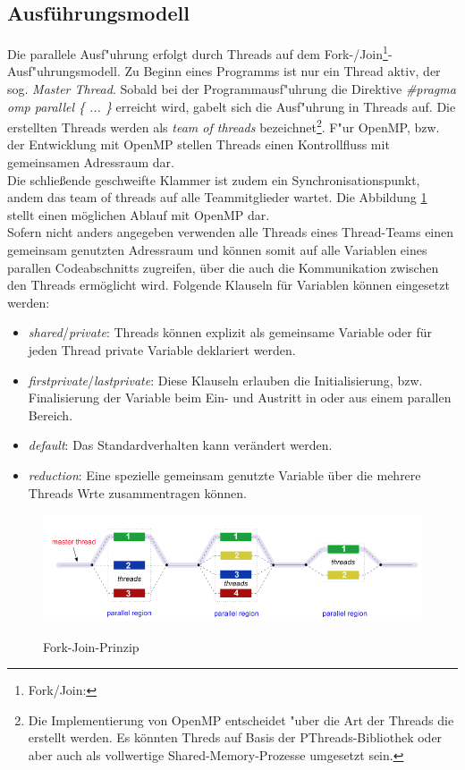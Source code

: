 \documentclass[11pt]{scrartcl}
\begin{document}
\subsection{Ausführungsmodell} Die parallele Ausf"uhrung erfolgt durch Threads auf dem
Fork-/Join\footnote{Fork/Join:}-Ausf"uhrungsmodell. Zu Beginn eines Programms ist nur ein Thread aktiv, der sog. \textit{Master Thread}. Sobald bei der Programmausf"uhrung die Direktive \textit{\#pragma omp parallel \{ ... \} } erreicht wird, gabelt sich die
Ausf"uhrung in Threads auf. Die erstellten Threads werden als \textit{team of threads}
bezeichnet\footnote{Die Implementierung von OpenMP entscheidet "uber die Art der Threads die erstellt werden. Es könnten Threds auf Basis der PThreads-Bibliothek oder aber auch als vollwertige Shared-Memory-Prozesse umgesetzt sein.}. F"ur OpenMP, bzw. der Entwicklung mit OpenMP stellen Threads einen Kontrollfluss mit gemeinsamen Adressraum dar. \\ 
Die schließende geschweifte Klammer ist zudem ein Synchronisationspunkt, andem das team of threads auf alle Teammitglieder wartet. Die Abbildung \ref{join_fork_model} stellt einen möglichen Ablauf mit OpenMP dar. \\
Sofern nicht anders angegeben verwenden alle Threads eines Thread-Teams einen gemeinsam genutzten Adressraum und können somit auf alle Variablen eines parallen Codeabschnitts zugreifen, über die auch die Kommunikation zwischen den Threads ermöglicht wird. Folgende Klauseln für Variablen können eingesetzt werden:
\begin{itemize}
\item \textit{shared}/\textit{private}: Threads können explizit als gemeinsame Variable oder für jeden Thread private Variable deklariert werden.
\item \textit{firstprivate}/\textit{lastprivate}: Diese Klauseln erlauben die Initialisierung, bzw. Finalisierung der Variable beim Ein- und Austritt in oder aus einem parallen Bereich.
\item \textit{default}: Das Standardverhalten kann verändert werden. %
\item \textit{reduction}: Eine spezielle gemeinsam genutzte Variable über die mehrere Threads Wrte zusammentragen können.
\end{itemize}


\begin{figure}[h!]
\centering
\includegraphics[width=1.0\textwidth]{img/fork_join.png}
\label{join_fork_model}
\caption{Fork-Join-Prinzip}
\end{figure} 
\end{document}
